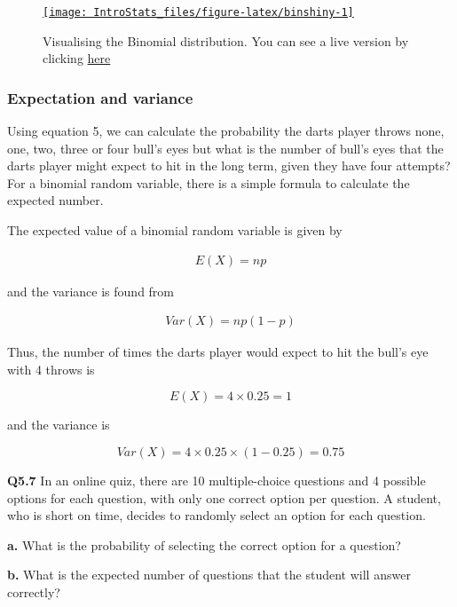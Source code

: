 \documentclass[
  oneside]{krantz}
\begin{document}
\begin{figure}

{\centering \href{https://moniquemackenzie.shinyapps.io/IntroStats_Binomial/}{\texttt{[image: IntroStats\_files/figure-latex/binshiny-1]} }

}

\caption{Visualising the Binomial distribution. You can see a live version by clicking \href{https://moniquemackenzie.shinyapps.io/IntroStats_Binomial/}{here}}\label{fig:binshiny}
\end{figure}

\hypertarget{expectation-and-variance}{%
\subsubsection{Expectation and variance}\label{expectation-and-variance}}

Using equation 5, we can calculate the probability the darts player throws none, one, two, three or four bull's eyes but what is the number of bull's eyes that the darts player might expect to hit in the long term, given they have four attempts? For a binomial random variable, there is a simple formula to calculate the expected number.

The expected value of a binomial random variable is given by

\begin{align}
E(X) = np
\end{align}

and the variance is found from

\begin{align}
Var(X) = np(1-p)
\end{align}

Thus, the number of times the darts player would expect to hit the bull's eye with 4 throws is

\[E(X) = 4 \times 0.25 = 1\]

and the variance is

\[Var(X) = 4 \times 0.25 \times (1-0.25) = 0.75\]

\textbf{Q5.7} In an online quiz, there are 10 multiple-choice questions and 4 possible options for each question, with only one correct option per question. A student, who is short on time, decides to randomly select an option for each question.

\textbf{a.} What is the probability of selecting the correct option for a question?

\textbf{b.} What is the expected number of questions that the student will answer correctly?
\end{document}
